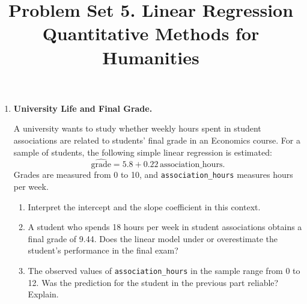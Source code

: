 \documentclass[12pt]{article}
\author{\empty}
\title{Problem Set 5. Linear Regression \\ Quantitative Methods for Humanities}
\date{\empty}
\newif\ifsolutions
\begin{document}
\maketitle

\bigskip

\begin{enumerate}
    \item \textbf{University Life and Final Grade.}

    A university wants to study whether weekly hours spent in student associations are related to students' final grade in an Economics course. For a sample of students, the following simple linear regression is estimated:
    \[
        \widehat{\text{grade}} = 5.8 + 0.22\,\text{association\_hours}.
    \]
    Grades are measured from 0 to 10, and \texttt{association\_hours} measures hours per week.

    \begin{enumerate}[label=(\alph*)]
        \item Interpret the intercept and the slope coefficient in this context.
        \item A student who spends 18 hours per week in student associations obtains a final grade of 9.44. Does the linear model under or overestimate the student's performance in the final exam?
        \item The observed values of \texttt{association\_hours} in the sample range from 0 to 12. Was the prediction for the student in the previous part reliable? Explain.
    \end{enumerate}

    \ifsolutions \color{blue} \textbf{Solution:} \\
    \begin{enumerate}[label=(\alph*)]
        \item The intercept, 5.8, is the predicted average grade for a student who spends 0 hours per week in student associations. The slope, 0.22, means that increasing association participation by one hour per week is associated with an increase of 0.22 points in the predicted average grade, on average.
        \item For 6 hours:
        \[
            \widehat{\text{grade}} = 5.8 + 0.22 \times 6 = 5.8 + 1.32 = 7.12.
        \]
        The residual is $\widehat u = 7.12 - 6.7 = 0.42$, meaning that the model overpredicts this student's grade by 0.42 points.
        \item This would be an extrapolation, because 18 hours is outside the observed range of the predictor in the sample. The prediction is therefore less reliable than a prediction made within the range 0 to 12.
    \end{enumerate}
    \fi \color{black}


\end{enumerate}
\end{document}
